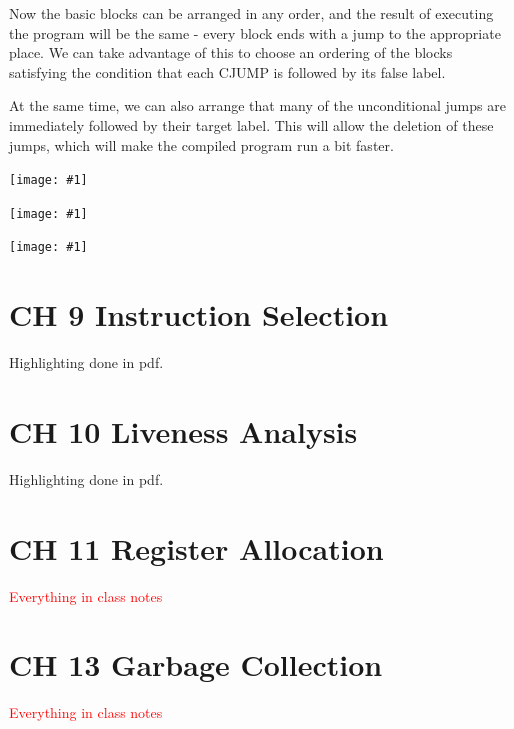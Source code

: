 \documentclass[8pt, a4paper, oneside, twocolumn]{extarticle}
\newcommand{\ph}[1]{
    \texttt{[image: \#1]}
}
\begin{document}
Now the basic blocks can be arranged in any order, and the result of executing
the program will be the same - every block ends with a jump to the 
appropriate place. We can take advantage of this to choose an ordering of the blocks
satisfying the condition that each CJUMP is followed by its false label.

At the same time, we can also arrange that many of the unconditional
jumps are immediately followed by their target label. This will allow the
deletion of these jumps, which will make the compiled program run a bit
faster.

\ph{818}

\ph{819}

\ph{820}

\section{CH 9 Instruction Selection}

Highlighting done in pdf.

\section{CH 10 Liveness Analysis}

Highlighting done in pdf.

\section{CH 11 Register Allocation}

\textcolor{red}{Everything in class notes}

\section{CH 13 Garbage Collection}

\textcolor{red}{Everything in class notes}
\end{document}
